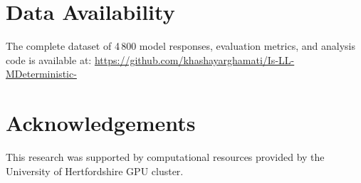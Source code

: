 \documentclass[11pt,a4paper]{article}
\begin{document}
\section*{Data Availability}
The complete dataset of 4\,800 model responses, evaluation metrics, and analysis code is available at: \url{https://github.com/khashayarghamati/Is-LL-MDeterministic-}

\section*{Acknowledgements}
This research was supported by computational resources provided by the University of Hertfordshire GPU cluster.



\end{document}
